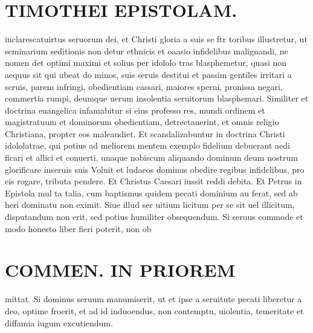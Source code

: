 \documentclass{article}
\begin{document}
\begin{pages}
\section*{TIMOTHEI EPISTOLAM. }
\marginpar{[ p.153 ]}\pstart inclarescatuirtus seruorum dei, et Christi gloria a suis se ftr toribus illustretur, ut seminarium seditionis non detur ethnicis et oaasio infidelibus malignandi, ne nomen det optimi maximi et solius per idololo tras blasphemetur, quasi non aequus sit qui ubeat do minos, suis seruis destitui et passim gentiles irritari a scruis, parem infringi, obedientiam cassari, maiores sperni, pronissa negari, commertia rumpi, deumque  uerum insolentia seruitorum blasphemari. Similiter et doctrina euangelica infamabitur si eius professo res, mundi ordinem et magistratuum et dominorum obedientiam, detrectauerint, et omnis religio Christiana, propter eos maleaudiet. Et scandalizabuntur in doctrina Christi idololatrae, qui potius ad meliorem mentem exemplo fidelium debuerant aedi ficari et allici et conuerti, unaque nobiscum aliquando dominum deum nostrum glorificare inseruis suis Voluit et ludaeos dominus obedire regibus infidelibus, pro eis rogare, tributa pendere. Et Christus Caesari iussit reddi debita. Et Petrus in Epistola mul ta talia, cum baptismus quidem pecati dominium au ferat, sed ab heri dominatu non eximit. Siue illud ser uitium licitum per se sit uel illicitum, disputandum non erit, sed potius humiliter obsequendum. Si seruus commode et modo honesto liber fieri poterit, non ob  \pend
\section*{COMMEN. IN PRIOREM }
\marginpar{[ p.154 ]}\pstart mittat. Si dominus seruum manumiserit, ut et ipse a seruitute pecati liberetur a deo, optime froerit, et ad id induoendus, non contemptu, uiolentia, temeritate et diffamia iugum excutiendum.  \pend
{}
{}

\end{pages}
\end{document}
